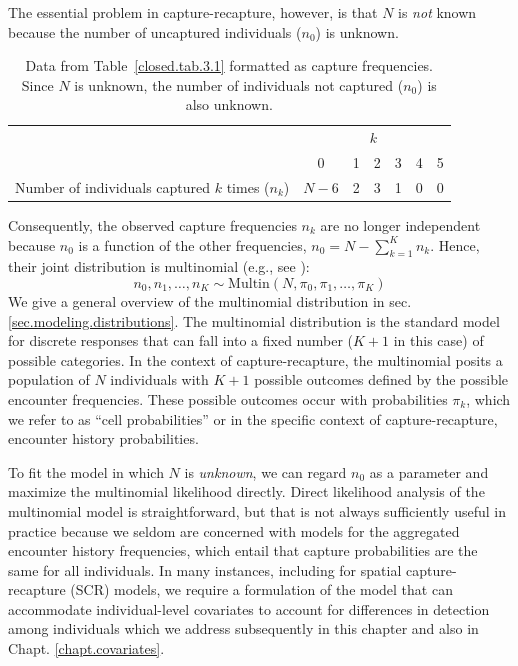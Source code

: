 The essential problem in capture-recapture, however, is that $N$ is
{\it not} known because the number of uncaptured %
individuals ($n_0$)
is unknown. %
\begin{table}
\centering
\caption{Data from Table~\ref{closed.tab.3.1} formatted as capture
  frequencies. Since $N$ is unknown, the number of individuals not
  captured ($n_0$) is also unknown.}
\begin{tabular}{lcccccc}
\hline
& \multicolumn{6}{c}{$k$} \\
\cline{2-7}
 & 0  & 1 & 2 & 3 & 4 & 5 \\
\hline
Number of individuals captured $k$ times ($n_k$) & $N-6$ & 2 & 3 & 1 & 0 & 0 \\
\hline
\end{tabular}
\label{closed.tab.3.1.nk}
\end{table}
Consequently, the observed capture frequencies $n_k$ are no
longer independent because $n_0$ is a function of the other
frequencies, $n_0 = N-\sum_{k=1}^K n_k$. Hence, their joint distribution is multinomial
(e.g., see \citet[][p. xyz]{illian_etal:2008}):
\begin{equation}
    n_0, n_1, \ldots, n_K \sim \mathrm{Multin}(N, \pi_0, \pi_1, \ldots, \pi_K)
\label{closed.eq.multinomial4m0}
\end{equation}
We give a general overview of the multinomial distribution in
sec. \ref{sec.modeling.distributions}. The multinomial distribution is
the standard model for discrete responses that can fall into a fixed
number ($K+1$ in this case) of possible categories. In the context of
capture-recapture, the multinomial posits a population of $N$
individuals with $K+1$ possible outcomes defined by the possible
encounter frequencies. These possible outcomes occur with
probabilities $\pi_{k}$, which we refer to as ``cell probabilities''
or in the specific context of capture-recapture, encounter history
probabilities.


To fit the model in which $N$ is {\it unknown}, we can regard $n_{0}$ as a
parameter and maximize the multinomial likelihood directly.
Direct likelihood analysis of the multinomial model is
straightforward, but that is not always sufficiently useful in practice
because we seldom are concerned with models for the aggregated
encounter history frequencies, which entail that capture probabilities are the
same for all individuals. In many instances, including for
spatial capture-recapture (SCR) models, we require a formulation of
the model that can accommodate individual-level
covariates to account for
differences in detection among individuals which we
address subsequently in this chapter and also in Chapt. \ref{chapt.covariates}.



